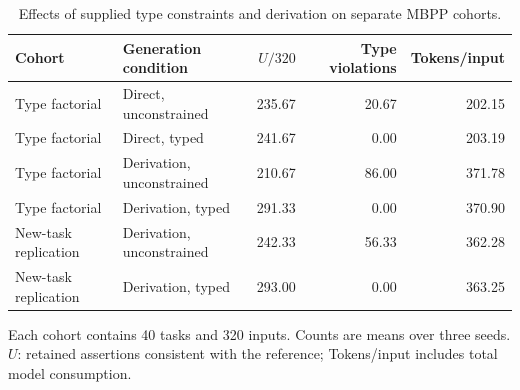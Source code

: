 \begin{table}[t]
\centering
\small
\caption{Effects of supplied type constraints and derivation on separate MBPP cohorts.}
\label{tab:types}
\begin{tabular}{llrrr}
\toprule
Cohort & Generation condition & $U/320$ & Type violations & Tokens/input \\
\midrule
Type factorial & Direct, unconstrained & 235.67 & 20.67 & 202.15 \\
Type factorial & Direct, typed & 241.67 & 0.00 & 203.19 \\
Type factorial & Derivation, unconstrained & 210.67 & 86.00 & 371.78 \\
Type factorial & Derivation, typed & 291.33 & 0.00 & 370.90 \\
New-task replication & Derivation, unconstrained & 242.33 & 56.33 & 362.28 \\
New-task replication & Derivation, typed & 293.00 & 0.00 & 363.25 \\
\bottomrule
\end{tabular}
\par\smallskip
\begin{minipage}{\linewidth}
\footnotesize
Each cohort contains 40 tasks and 320 inputs. Counts are means over three seeds. $U$: retained assertions consistent with the reference; Tokens/input includes total model consumption.
\end{minipage}
\end{table}
